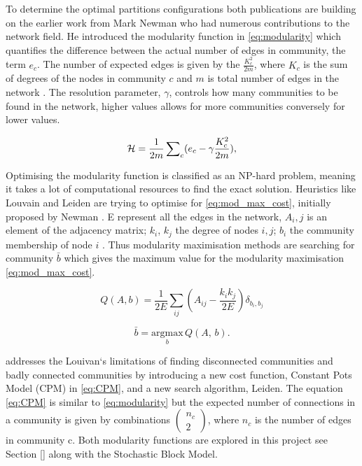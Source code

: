 To determine the optimal partitions configurations both publications are building on the earlier work from Mark Newman who had numerous contributions to the network field. He introduced the modularity function in \cref{eq:modularity} \cite{Newman2004-dd} which quantifies the difference between the actual number of edges in community, the term $e_c$. The number of expected edges is given by the $\frac{K_c^2}{2m}$, where $K_c$ is the sum of degrees of the nodes in community $c$ and $m$ is total number of edges in the network \cite{Traag2019-ne}. The resolution parameter, $\gamma$, controls how many communities to be found in the network, higher values allows for more communities conversely for lower values.


\begin{equation} \label{eq:modularity}
    {\mathcal H} =\frac{1}{2m}\,{\sum }_{c}({e}_{c}-{\rm{\gamma }}\frac{{K}_{c}^{2}}{2m}),
\end{equation}

Optimising the modularity function is classified as an NP-hard problem, meaning it takes a lot of computational resources to find the exact solution. Heuristics like Louvain and Leiden are trying to optimise for \cref{eq:mod_max_cost}, initially proposed by Newman \cite{Newman2006-fa}. E represent all the edges in the network, $A_i,j$ is an element of the adjacency matrix; $k_i$, $k_j$ the degree of nodes $i,j$; $b_i$ the community membership of node $i$ \cite{Peixoto2021-jx}. Thus modularity maximisation methods are searching for community $\bar{b}$ which gives the maximum value for the modularity maximisation \cref{eq:mod_max_cost}.

\begin{equation} \label{eq:mod_max_cost}
    Q(A,b) = \frac{1}{2E} \sum_{ij} \left( A_{ij} - \frac{k_i k_j}{2E} \right) \delta_{b_i, b_j}
\end{equation}

\begin{equation} \label{eq:mod_max_per_com}
    \bar{b} = \underset{b}{\mathrm{argmax}} \, Q(A, \, b).
\end{equation}

\citet{Traag2019-ne} addresses the Louivan`s limitations of finding disconnected communities  and badly connected communities by introducing a new cost function, Constant Pots Model (CPM) in \cref{eq:CPM}, and a new search algorithm, Leiden. The equation \cref{eq:CPM} is similar to \cref{eq:modularity} but the expected number of connections in a community is given by combinations $(\begin{array}{c}{n}_{c}\\ 2\end{array})$, where $n_c$ is the number of edges in community c. Both modularity functions are explored in this project see Section \ref{} along with the Stochastic Block Model.

